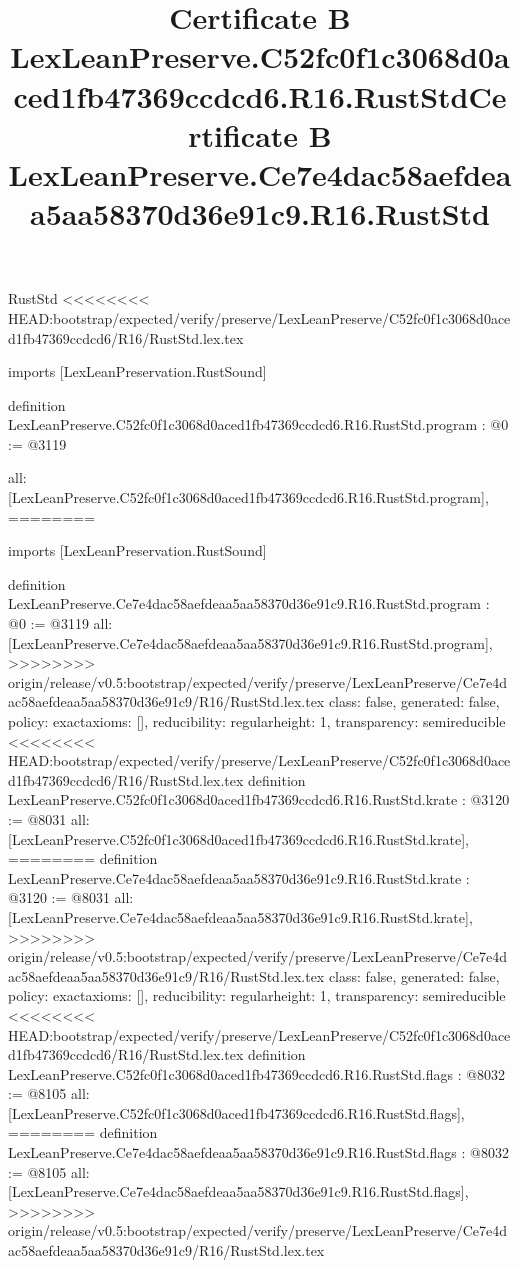 \begin{lexlean}{RustStd}
<<<<<<<< HEAD:bootstrap/expected/verify/preserve/LexLeanPreserve/C52fc0f1c3068d0aced1fb47369ccdcd6/R16/RustStd.lex.tex
\title{Certificate B LexLeanPreserve.C52fc0f1c3068d0aced1fb47369ccdcd6.R16.RustStd}
\begin{coremodule}
imports [LexLeanPreservation.RustSound]

definition LexLeanPreserve.C52fc0f1c3068d0aced1fb47369ccdcd6.R16.RustStd.program : @0 := @3119 {
  all: [LexLeanPreserve.C52fc0f1c3068d0aced1fb47369ccdcd6.R16.RustStd.program],
========
\title{Certificate B LexLeanPreserve.Ce7e4dac58aefdeaa5aa58370d36e91c9.R16.RustStd}
\begin{coremodule}
imports [LexLeanPreservation.RustSound]

definition LexLeanPreserve.Ce7e4dac58aefdeaa5aa58370d36e91c9.R16.RustStd.program : @0 := @3119 {
  all: [LexLeanPreserve.Ce7e4dac58aefdeaa5aa58370d36e91c9.R16.RustStd.program],
>>>>>>>> origin/release/v0.5:bootstrap/expected/verify/preserve/LexLeanPreserve/Ce7e4dac58aefdeaa5aa58370d36e91c9/R16/RustStd.lex.tex
  class: false,
  generated: false,
  policy: exact{axioms: []},
  reducibility: regular{height: 1},
  transparency: semireducible
}
<<<<<<<< HEAD:bootstrap/expected/verify/preserve/LexLeanPreserve/C52fc0f1c3068d0aced1fb47369ccdcd6/R16/RustStd.lex.tex
definition LexLeanPreserve.C52fc0f1c3068d0aced1fb47369ccdcd6.R16.RustStd.krate : @3120 := @8031 {
  all: [LexLeanPreserve.C52fc0f1c3068d0aced1fb47369ccdcd6.R16.RustStd.krate],
========
definition LexLeanPreserve.Ce7e4dac58aefdeaa5aa58370d36e91c9.R16.RustStd.krate : @3120 := @8031 {
  all: [LexLeanPreserve.Ce7e4dac58aefdeaa5aa58370d36e91c9.R16.RustStd.krate],
>>>>>>>> origin/release/v0.5:bootstrap/expected/verify/preserve/LexLeanPreserve/Ce7e4dac58aefdeaa5aa58370d36e91c9/R16/RustStd.lex.tex
  class: false,
  generated: false,
  policy: exact{axioms: []},
  reducibility: regular{height: 1},
  transparency: semireducible
}
<<<<<<<< HEAD:bootstrap/expected/verify/preserve/LexLeanPreserve/C52fc0f1c3068d0aced1fb47369ccdcd6/R16/RustStd.lex.tex
definition LexLeanPreserve.C52fc0f1c3068d0aced1fb47369ccdcd6.R16.RustStd.flags : @8032 := @8105 {
  all: [LexLeanPreserve.C52fc0f1c3068d0aced1fb47369ccdcd6.R16.RustStd.flags],
========
definition LexLeanPreserve.Ce7e4dac58aefdeaa5aa58370d36e91c9.R16.RustStd.flags : @8032 := @8105 {
  all: [LexLeanPreserve.Ce7e4dac58aefdeaa5aa58370d36e91c9.R16.RustStd.flags],
>>>>>>>> origin/release/v0.5:bootstrap/expected/verify/preserve/LexLeanPreserve/Ce7e4dac58aefdeaa5aa58370d36e91c9/R16/RustStd.lex.tex
}}}
\end{coremodule}}
\end{coremodule}
\end{lexlean}
